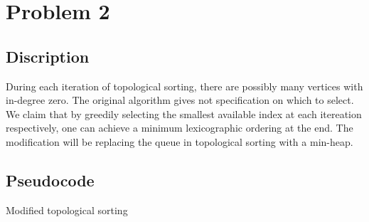 \documentclass{report}
\begin{document}
    \section*{Problem 2}
    \subsection*{Discription}
    During each iteration of topological sorting, there are possibly many vertices with 
    in-degree zero. The original algorithm gives not specification on which to select. 
    We claim that by greedily selecting the smallest available index at each itereation 
    respectively, one can achieve a minimum lexicographic ordering at the end.
    The modification will be replacing the queue in topological sorting with a min-heap. 
    \newpage
    \subsection*{Pseudocode}
    \begin{algorithm}
        \caption{Modified topological sorting}
        \begin{algorithmic}[1]
                \EndIf{}
            \EndFor{}
                    \EndIf{}
                \EndFor{}
            \EndWhile{}
        \end{algorithmic}
    \end{algorithm}
\end{document}
